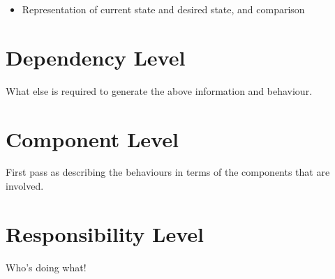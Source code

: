 \documentclass{article}
\begin{document}
\begin{itemize}

\item Representation of current state and desired state, and
  comparison

\end{itemize}




\section{Dependency Level}

What else is required to generate the above information and behaviour.

\section{Component Level}

First pass as describing the behaviours in terms of the components
that are involved.

\section{Responsibility Level}

Who's doing what!
\end{document}
